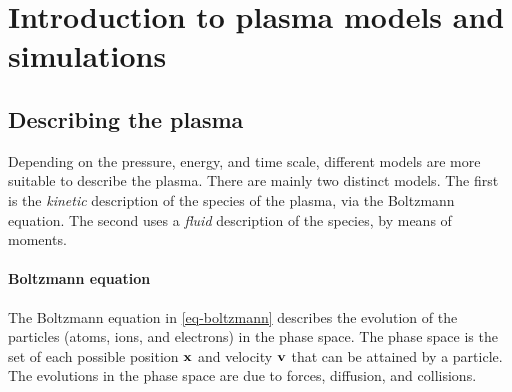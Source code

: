 

\section{Introduction to plasma models and simulations}
\label{sec-simulations}

\subsection{Describing the plasma} \label{subsec-phy}

Depending on the pressure, energy, and time scale, different models are more suitable to describe the plasma.
There are mainly two distinct models.
The first is the \emph{kinetic} description of the species of the plasma, via the Boltzmann equation.
The second uses a \emph{fluid} description of the species, by means of moments.
% 


\paragraph{Boltzmann equation \\}
The Boltzmann equation in \cref{eq-boltzmann} describes the evolution of the particles (atoms, ions, and electrons) in the phase space.
The phase space is the set of each possible position ${\mathbf x}$ and velocity ${\mathbf v}$ that can be attained by a particle.
The evolutions in the phase space are due to forces, diffusion, and collisions.

